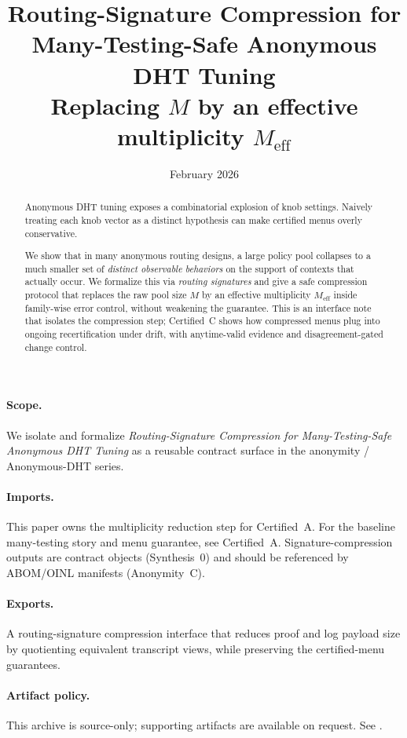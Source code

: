 \documentclass[11pt]{article}
\title{Routing-Signature Compression for Many-Testing-Safe Anonymous DHT Tuning\\
\large Replacing $M$ by an effective multiplicity $M_{\mathrm{eff}}$}
\author{}
\date{February 2026}
\begin{document}
\maketitle

\begin{abstract}
Anonymous DHT tuning exposes a combinatorial explosion of knob settings.
Naively treating each knob vector as a distinct hypothesis can make certified menus overly conservative.

We show that in many anonymous routing designs, a large policy pool collapses to a much smaller set of \emph{distinct observable behaviors} on the support of contexts that actually occur.
We formalize this via \emph{routing signatures} and give a safe compression protocol that replaces the raw pool size $M$ by an effective multiplicity $M_{\mathrm{eff}}$ inside family-wise error control, without weakening the guarantee.
This is an interface note that isolates the compression step; Certified~C shows how compressed menus plug into ongoing recertification under drift, with anytime-valid evidence and disagreement-gated change control.
\end{abstract}

\paragraph{Scope.}
We isolate and formalize \emph{Routing-Signature Compression for Many-Testing-Safe Anonymous DHT Tuning} as a reusable contract surface in the anonymity / Anonymous-DHT series.

\paragraph{Imports.}
This paper owns the multiplicity reduction step for Certified~A.
For the baseline many-testing story and menu guarantee, see Certified~A.\cite{series:certifiedmenus}
Signature-compression outputs are contract objects (Synthesis~0) and should be referenced by ABOM/OINL manifests (Anonymity~C).\cite{series:contractobjects,series:abomoinl}

\paragraph{Exports.}
A routing-signature compression interface that reduces proof and log payload size by quotienting equivalent transcript views, while preserving the certified-menu guarantees.

\paragraph{Artifact policy.}
This archive is source-only; supporting artifacts are available on request. See \cite{series:artifactpolicy}.
\end{document}
